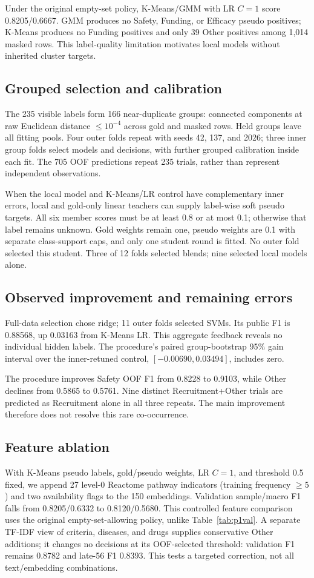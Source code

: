 Under the original empty-set policy, K-Means/GMM with LR $C=1$ score 0.8205/0.6667.
GMM produces no Safety, Funding, or Efficacy pseudo positives; K-Means produces no Funding
positives and only 39 Other positives among 1,014 masked rows. This label-quality limitation
motivates local models without inherited cluster targets.

\subsection{Grouped selection and calibration}
The 235 visible labels form 166 near-duplicate groups: connected components at raw Euclidean
distance $\leq10^{-4}$ across gold and masked rows. Held groups leave all fitting pools.
Four outer folds repeat with seeds 42, 137, and 2026; three inner group folds select models
and decisions, with further grouped calibration inside each fit. The 705 OOF predictions
repeat 235 trials, rather than represent independent observations.

When the local model and K-Means/LR control have complementary inner errors, local and
gold-only linear teachers can
supply label-wise soft pseudo targets. All six member scores must be at least 0.8 or at most
0.1; otherwise that label remains unknown. Gold weights remain one, pseudo weights are 0.1
with separate class-support caps, and only one student round is fitted. No outer fold selected
this student. Three of 12 folds selected blends; nine selected local models alone.

\subsection{Observed improvement and remaining errors}
Full-data selection chose ridge; 11 outer folds selected SVMs. Its public F1 is 0.88568,
up 0.03163 from K-Means LR. This aggregate feedback reveals no individual hidden labels.
The procedure's paired group-bootstrap 95\% gain interval over the inner-retuned control,
$[-0.00690,0.03494]$, includes zero.

The procedure improves Safety OOF F1 from 0.8228 to 0.9103, while Other declines from 0.5865
to 0.5761. Nine distinct Recruitment+Other trials are predicted as Recruitment alone in all
three repeats. The main improvement therefore does not resolve this rare co-occurrence.

\subsection{Feature ablation}
\label{sec:p1features}
With K-Means pseudo labels, gold/pseudo weights, LR $C=1$, and threshold 0.5 fixed,
we append 27 level-0 Reactome pathway indicators (training frequency $\geq5$) and two
availability flags to the 150 embeddings. Validation sample/macro F1 falls from
0.8205/0.6332 to 0.8120/0.5680. This controlled feature comparison uses the original
empty-set-allowing policy, unlike Table~\ref{tab:p1val}.
A separate TF-IDF view of criteria, diseases, and drugs supplies conservative Other additions;
it changes no decisions at its OOF-selected threshold: validation F1 remains 0.8782 and
late-56 F1 0.8393. This tests a targeted correction, not all text/embedding combinations.
